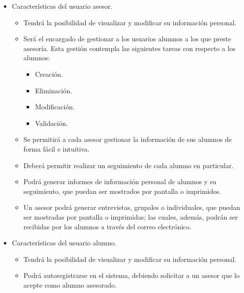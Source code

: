 \begin{itemize}
   \item Características del usuario asesor.
      \begin{itemize}
         \item Tendrá la posibilidad de visualizar y modificar su información
         personal.
         \item Será el encargado de gestionar a los usuarios alumnos a los que
         preste asesoría. Esta gestión contempla las siguientes tareas con
         respecto a los alumnos:
         \begin{itemize}
            \item Creación.
            \item Eliminación.
            \item Modificación.
            \item Validación.
         \end{itemize}
         \item Se permitirá a cada asesor gestionar la información de sus
         alumnos de forma fácil e intuitiva.
         \item Deberá permitir realizar un seguimiento de cada alumno en
         particular.
         \item Podrá generar informes de información personal de alumnos y su
         seguimiento, que puedan ser mostrados por pantalla o imprimidos.
         \item Un asesor podrá generar entrevistas, grupales o individuales, que
         puedan ser mostradas por pantalla o imprimidas; las cuales, además,
         podrán ser recibidas por los alumnos a través del correo electrónico.
      \end{itemize}

   \item Características del usuario alumno.
      \begin{itemize}
         \item Tendrá la posibilidad de visualizar y modificar su información
         personal.
         \item Podrá autoregistrarse en el sistema, debiendo solicitar
         a un asesor que lo acepte como alumno asesorado.
      \end{itemize}
\end{itemize}

